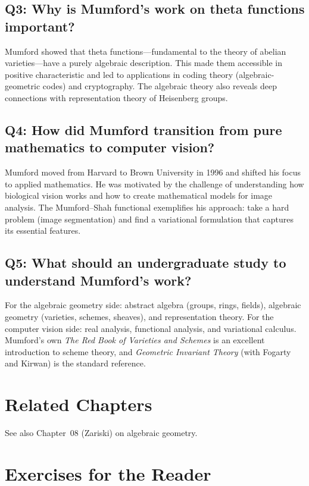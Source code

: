 \subsection*{Q3: Why is Mumford's work on theta functions important?}
Mumford showed that theta functions---fundamental to the theory of abelian varieties---have a purely algebraic description. This made them accessible in positive characteristic and led to applications in coding theory (algebraic-geometric codes) and cryptography. The algebraic theory also reveals deep connections with representation theory of Heisenberg groups.

\subsection*{Q4: How did Mumford transition from pure mathematics to computer vision?}
Mumford moved from Harvard to Brown University in 1996 and shifted his focus to applied mathematics. He was motivated by the challenge of understanding how biological vision works and how to create mathematical models for image analysis. The Mumford--Shah functional exemplifies his approach: take a hard problem (image segmentation) and find a variational formulation that captures its essential features.

\subsection*{Q5: What should an undergraduate study to understand Mumford's work?}
For the algebraic geometry side: abstract algebra (groups, rings, fields), algebraic geometry (varieties, schemes, sheaves), and representation theory. For the computer vision side: real analysis, functional analysis, and variational calculus. Mumford's own \textit{The Red Book of Varieties and Schemes} is an excellent introduction to scheme theory, and \textit{Geometric Invariant Theory} (with Fogarty and Kirwan) is the standard reference.

\section{Related Chapters}
See also Chapter~08 (Zariski) on algebraic geometry.

\section*{Exercises for the Reader}

